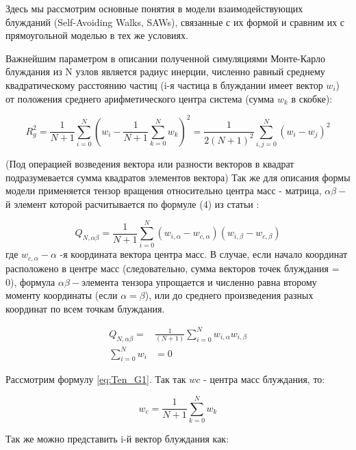 Здесь мы рассмотрим основные понятия в модели взаимодействующих блужданий (Self-Avoiding Walks, SAWs), связанные с их формой и сравним их с прямоугольной моделью в тех же условиях. 

Важнейшим параметром в описании полученной симуляциями Монте-Карло блуждания из N узлов является радиус инерции, численно равный среднему квадратическому расстоянию частиц (i-я частица в блуждании имеет вектор $w_{i}$) от положения среднего арифметического центра система (сумма $w_{k}$ в скобке)\cite{Pelissetto}:

\begin{equation}\label{eq:Rg}
    R^{2}_{g} = \frac{1}{N+1} \sum^{N}_{i=0}\left(w_{i} - \frac{1}{N+1}\sum^{N}_{k=0}w_{k}\right)^2 = \frac{1}{2(N+1)^{2}}\sum^{N}_{i,j=0}(w_{i} - w_{j})^{2}
\end{equation}

(Под операцией возведения вектора или разности векторов в квадрат подразумевается сумма квадратов элементов вектора) Так же для описания формы модели применяется тензор вращения относительно центра масс - матрица, $\alpha\beta-$й элемент которой расчитывается по формуле (4) из статьи\cite{Janke_G} :

\begin{equation}\label{eq:Ten_G1}
    Q_{N,\alpha\beta} = \frac{1}{N+1} \sum^{N}_{i=0}(w_{i,\alpha} - w_{c, \alpha})(w_{i,\beta} - w_{c, \beta})
\end{equation}
где $w_{c,\alpha} - \alpha$ -я координата вектора центра масс. В случае, если начало координат расположено в центре масс (следовательно, сумма векторов точек блуждания = 0), формула $\alpha\beta-$элемента тензора упрощается и численно равна второму моменту координаты (если $\alpha = \beta$), или до среднего произведения разных координат по всем точкам блуждания.


\begin{align}\label{eq:Ten_G_C}
    Q_{N,\alpha\beta} = &\frac{1}{(N+1)} \sum_{i=0}^{N} w_{i, \alpha} w_{i, \beta} \\
    \sum^{N}_{i=0}w_{i} &= 0
\end{align}

Рассмотрим формулу \eqref{eq:Ten_G1}. Так так $w{c}$ - центра масс блуждания, то:

\begin{equation}
    w_{c} = \frac{1}{N+1} \sum_{k=0}^{N} w_{k}
\end{equation}

Так же можно представить i-й вектор блуждания как:

